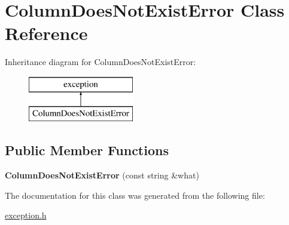\hypertarget{class_column_does_not_exist_error}{\section{Column\-Does\-Not\-Exist\-Error Class Reference}
\label{class_column_does_not_exist_error}
}
Inheritance diagram for Column\-Does\-Not\-Exist\-Error\-:\begin{figure}[H]
\begin{center}
\leavevmode
\includegraphics[height=2.000000cm]{class_column_does_not_exist_error}
\end{center}
\end{figure}
\subsection*{Public Member Functions}
\begin{DoxyCompactItemize}
\item 
\hypertarget{class_column_does_not_exist_error_ae4d5e02900c814ec4d64f78559911357}{{\bfseries Column\-Does\-Not\-Exist\-Error} (const string \&what)}\label{class_column_does_not_exist_error_ae4d5e02900c814ec4d64f78559911357}

\end{DoxyCompactItemize}


The documentation for this class was generated from the following file\-:\begin{DoxyCompactItemize}
\item 
\hyperlink{exception_8h}{exception.\-h}\end{DoxyCompactItemize}

